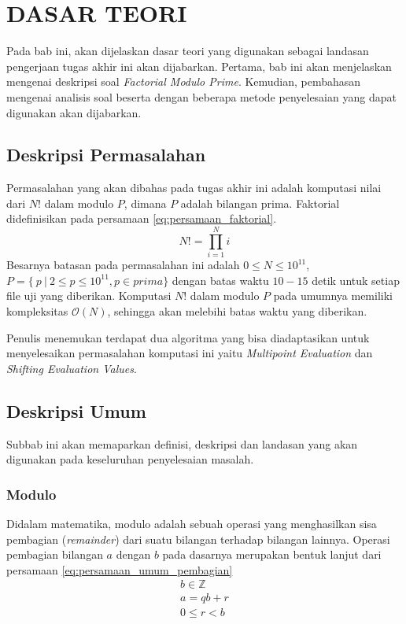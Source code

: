 \chapter {DASAR TEORI}

Pada bab ini, akan dijelaskan dasar teori yang digunakan sebagai landasan pengerjaan tugas akhir ini akan dijabarkan. Pertama, bab ini akan menjelaskan mengenai deskripsi soal \textit{Factorial Modulo Prime}. Kemudian, pembahasan mengenai analisis soal beserta dengan beberapa metode penyelesaian yang dapat digunakan akan dijabarkan.

\section{ Deskripsi Permasalahan}
Permasalahan yang akan dibahas pada tugas akhir ini adalah komputasi nilai dari $ N! $ dalam modulo $ P $, dimana $ P $ adalah bilangan prima. Faktorial didefinisikan pada persamaan \eqref{eq:persamaan_faktorial}.
\begin{equation}
	N! = \prod_{i=1}^{N} i
	\label{eq:persamaan_faktorial}
\end{equation}
Besarnya batasan pada permasalahan ini adalah $ 0 \leq N \leq 10^{11} $, $ P = \{\ p\ |\ 2 \leq p \leq 10^{11} , p \in prima \} $ dengan batas waktu $ 10-15 $ detik untuk setiap file uji yang diberikan. Komputasi $ N! $ dalam modulo $ P $ pada umumnya memiliki kompleksitas $ \mathcal{O}{(N)} $, sehingga akan melebihi batas waktu yang diberikan.

Penulis menemukan terdapat dua algoritma yang bisa diadaptasikan untuk menyelesaikan permasalahan komputasi ini yaitu \textit{Multipoint Evaluation} dan \textit{Shifting Evaluation Values}.

\section{ Deskripsi Umum}

Subbab ini akan memaparkan definisi, deskripsi dan landasan yang akan digunakan pada keseluruhan penyelesaian masalah.

\subsection{ Modulo}
Didalam matematika, modulo adalah sebuah operasi yang menghasilkan sisa pembagian (\textit{remainder}) dari suatu bilangan terhadap bilangan lainnya. Operasi pembagian bilangan $ a $ dengan $ b $ pada dasarnya merupakan bentuk lanjut dari persamaan \eqref{eq:persamaan_umum_pembagian}
\begin{equation}
	\begin{aligned}
		b \in \mathbb {Z}\\
		a=qb+r\\
		0 \leq r < b \\
	\end{aligned}
	\label{eq:persamaan_umum_pembagian}
\end{equation}

